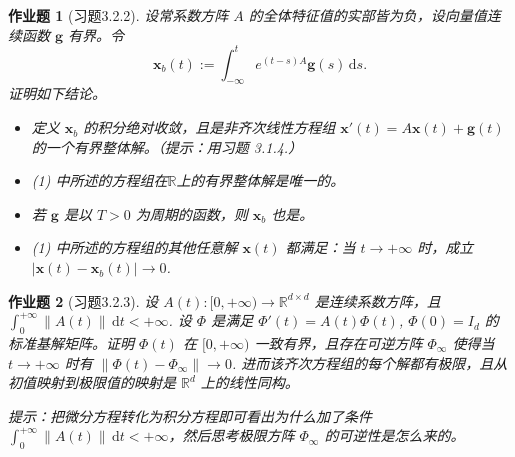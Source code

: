 \documentclass[UTF8,fontset=windows,12pt]{ctexart}
\theoremstyle{kaiti-theorem}
\newtheorem{problem}{作业题}
\numberwithin{equation}{section}
\newcommand{\R}{\mathbb{R}}
\newcommand{\bds}[1]{\boldsymbol{#1}}  %
\newcommand{\dt}{\,\mathrm{d}t}
\newcommand{\ds}{\,\mathrm{d}s}
\newcommand{\xx}{{\bds{x}}}
\newcommand{\fg}{\mathbf{g}}
\begin{document}
\begin{problem}[习题3.2.2]
设常系数方阵 $A$ 的全体特征值的实部皆为负，设向量值连续函数 $\fg$ 有界。令 $$\xx_b(t):=\int_{-\infty}^t e^{(t-s)A} \fg(s)\ds.$$ 证明如下结论。
\begin{itemize}
\item [(1)] 定义 $\xx_b$ 的积分绝对收敛，且是非齐次线性方程组 $\xx'(t)=A\xx(t)+\fg(t)$ 的一个有界整体解。（提示：用习题 3.1.4.）
\item [(2)] (1) 中所述的方程组在$\R$上的有界整体解是唯一的。
\item [(3)] 若 $\fg$ 是以 $T>0$ 为周期的函数，则 $\xx_b$ 也是。
\item [(4)]  (1) 中所述的方程组的其他任意解 $\xx(t)$ 都满足：当 $t\to+\infty$ 时，成立 $|\xx(t)-\xx_b(t)|\to 0$.
\end{itemize}
\end{problem}

\begin{problem}[习题3.2.3]
设 $A(t):[0,+\infty)\to \R^{d\times d}$ 是连续系数方阵，且 $\int_0^{+\infty}\|A(t)\|\dt<+\infty$. 设 $\Phi$ 是满足 $\Phi'(t)=A(t)\Phi(t)$, $\Phi(0)=I_d$ 的标准基解矩阵。证明 $\Phi(t)$ 在 $[0,+\infty)$ 一致有界，且存在可逆方阵 $\Phi_\infty$ 使得当 $t\to+\infty$ 时有 $\|\Phi(t)-\Phi_\infty\|\to 0$. 进而该齐次方程组的每个解都有极限，且从初值映射到极限值的映射是 $\R^d$ 上的线性同构。

提示：把微分方程转化为积分方程即可看出为什么加了条件 $\int_0^{+\infty}\|A(t)\|\dt<+\infty$，然后思考极限方阵 $\Phi_\infty$ 的可逆性是怎么来的。
\end{problem}
\end{document}
